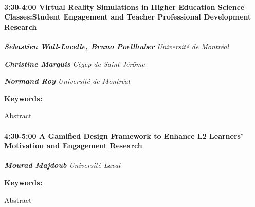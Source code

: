 \documentclass[
]{book}
\begin{document}
\begin{session}
\hypertarget{virtual-reality-simulations-in-higher-education-science-classesstudent-engagement-and-teacher-professional-development-research}{%
\paragraph*{\texorpdfstring{3:30-4:00 \textbar{} \textbf{Virtual Reality
Simulations in Higher Education Science Classes:Student Engagement and
Teacher Professional Development} \textbar{}
Research}{3:30-4:00 \textbar{} Virtual Reality Simulations in Higher Education Science Classes:Student Engagement and Teacher Professional Development \textbar{} Research}}\label{virtual-reality-simulations-in-higher-education-science-classesstudent-engagement-and-teacher-professional-development-research}}

\textbf{\emph{Sebastien Wall-Lacelle, Bruno Poellhuber}} \textbar{}
\emph{Université de Montréal}

\textbf{\emph{Christine Marquis}} \textbar{} \emph{Cégep de
Saint-Jérôme}

\textbf{\emph{Normand Roy}} \textbar{} \emph{Université de Montréal}

\textbf{Keywords:}

Abstract
\end{session}

\begin{session}
\hypertarget{a-gamified-design-framework-to-enhance-l2-learners-motivation-and-engagement-research}{%
\paragraph*{\texorpdfstring{4:30-5:00 \textbar{} \textbf{A Gamified
Design Framework to Enhance L2 Learners' Motivation and Engagement}
\textbar{}
Research}{4:30-5:00 \textbar{} A Gamified Design Framework to Enhance L2 Learners' Motivation and Engagement \textbar{} Research}}\label{a-gamified-design-framework-to-enhance-l2-learners-motivation-and-engagement-research}}

\textbf{\emph{Mourad Majdoub}} \textbar{} \emph{Université Laval}

\textbf{Keywords:}

Abstract
\end{session}
\end{document}
